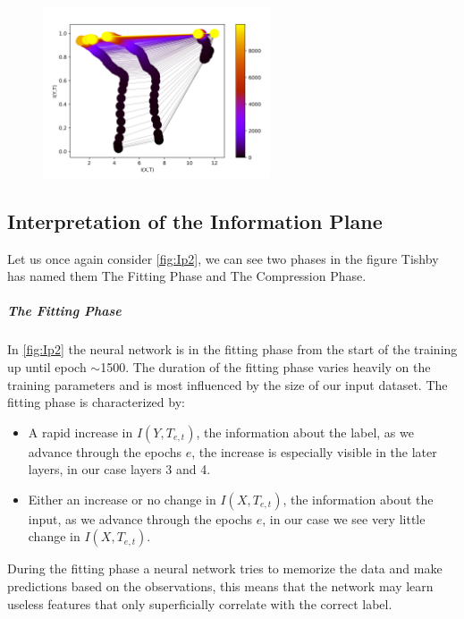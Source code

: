 \documentclass[dissertation.tex]{subfiles}
\begin{document}
\begin{figure}[H]
  \centering
  \includegraphics[width=0.60\textwidth]{figs/ip_10000.png}
  \label{fig:Ip2}
\end{figure}

\subsection{Interpretation of the Information Plane}

Let us once again consider \autoref{fig:Ip2}, we can see two phases in the figure
Tishby has named them The Fitting Phase and The Compression Phase.

\subparagraph{The Fitting Phase} In \autoref{fig:Ip2} the neural network is in
the fitting phase from the start of the training up until epoch $\sim$1500. The
duration of the fitting phase varies heavily on the training parameters and is
most influenced by the size of our input dataset. The fitting phase is
characterized by:
\begin{itemize}
  \item{
      A rapid increase in $I(Y, T_{e,t})$, the information about the label, as we
      advance through the epochs $e$, the increase is especially visible in the
      later layers, in our case layers 3 and 4.
    }
  \item{
      Either an increase or no change in $I(X, T_{e,t})$, the information about
      the input, as we advance through the epochs $e$, in our case we see very
      little change in $I(X,T_{e,t})$.
    }
\end{itemize}

During the fitting phase a neural network tries to memorize the data and make
predictions based on the observations, this means that the network may learn
useless features that only superficially correlate with the correct label.
\end{document}
